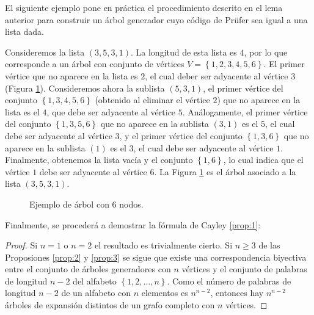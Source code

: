 El siguiente ejemplo pone en práctica el procedimiento descrito en el lema anterior para construir un árbol generador cuyo código de Prüfer sea igual a una lista dada.

\begin{exampleth}
Consideremos la lista $(3,5,3,1)$. La longitud de esta lista es $4$, por lo que corresponde a un árbol con conjunto de vértices $V = \left\lbrace 1,2,3,4,5,6 \right\rbrace$. El primer vértice que no aparece en la lista es $2$, el cual deber ser adyacente al vértice $3$ (Figura \ref{fig:arbol2}). Consideremos ahora la sublista $(5,3,1)$, el primer vértice del conjunto $\left\lbrace 1,3,4,5,6 \right\rbrace$ (obtenido al eliminar el vértice $2$) que no aparece en la lista es el $4$, que debe ser adyacente al vértice $5$. Análogamente, el primer vértice del conjunto $\left\lbrace 1,3,5,6 \right\rbrace$ que no aparece en la sublista $(3,1)$ es el $5$, el cual debe ser adyacente al vértice $3$, y el primer vértice del conjunto $\left\lbrace 1,3,6 \right\rbrace$ que no aparece en la sublista $(1)$ es el $3$, el cual debe ser adyacente al vértice $1$. Finalmente, obtenemos la lista vacía y el conjunto $\left\lbrace 1,6 \right\rbrace$, lo cual indica que el vértice $1$ debe ser adyacente al vértice $6$. La Figura \ref{fig:arbol2} es el árbol asociado a la lista $(3,5,3,1)$.
\end{exampleth}

\begin{figure}[H]
\centering
{}
\caption{Ejemplo de árbol con $6$ nodos.}
\label{fig:arbol2}
\end{figure}

Finalmente, se procederá a demostrar la fórmula de Cayley \ref{prop:1}:
\begin{proof}
Si $n = 1$ o $n = 2$ el resultado es trivialmente cierto. Si $n \geq 3$ de las Proposiones \ref{prop:2} y \ref{prop:3} se sigue que existe una correspondencia biyectiva entre el conjunto de árboles generadores con $n$ vértices y el conjunto de palabras de longitud $n-2$ del alfabeto $\left\lbrace 1,2,\dots,n \right\rbrace$. Como el número de palabras de longitud $n-2$ de un alfabeto con $n$ elementos es $n^{n-2}$, entonces hay $n^{n-2}$ árboles de expansión distintos de un grafo completo con $n$ vértices.
\end{proof}

